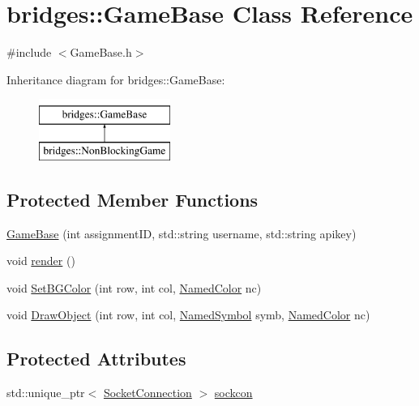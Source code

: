\hypertarget{classbridges_1_1_game_base}{}\section{bridges\+::Game\+Base Class Reference}
\label{classbridges_1_1_game_base}


{\ttfamily \#include $<$Game\+Base.\+h$>$}

Inheritance diagram for bridges\+::Game\+Base\+:\begin{figure}[H]
\begin{center}
\leavevmode
\includegraphics[height=2.000000cm]{classbridges_1_1_game_base}
\end{center}
\end{figure}
\subsection*{Protected Member Functions}
\begin{DoxyCompactItemize}
\item 
\mbox{\hyperlink{classbridges_1_1_game_base_a6c67b1c0ff17220a623217d5b053ba9b}{Game\+Base}} (int assignment\+ID, std\+::string username, std\+::string apikey)
\item 
void \mbox{\hyperlink{classbridges_1_1_game_base_a7b05208b74523a3add8502fdc7659b15}{render}} ()
\item 
void \mbox{\hyperlink{classbridges_1_1_game_base_a640c8711f7b3465956761a4eba86c5c0}{Set\+B\+G\+Color}} (int row, int col, \mbox{\hyperlink{namespacebridges_ad811207d8898a7fd6b72a74725e68357}{Named\+Color}} nc)
\item 
void \mbox{\hyperlink{classbridges_1_1_game_base_a40b48b30c466601638917f037dfadd67}{Draw\+Object}} (int row, int col, \mbox{\hyperlink{namespacebridges_acfb0a4f7877d8f63de3e6862004c50ed}{Named\+Symbol}} symb, \mbox{\hyperlink{namespacebridges_ad811207d8898a7fd6b72a74725e68357}{Named\+Color}} nc)
\end{DoxyCompactItemize}
\subsection*{Protected Attributes}
\begin{DoxyCompactItemize}
\item 
std\+::unique\+\_\+ptr$<$ \mbox{\hyperlink{classbridges_1_1_socket_connection}{Socket\+Connection}} $>$ \mbox{\hyperlink{classbridges_1_1_game_base_a3dfb0a0cd4d63c9ee937d4b9e7726efe}{sockcon}}
\end{DoxyCompactItemize}


